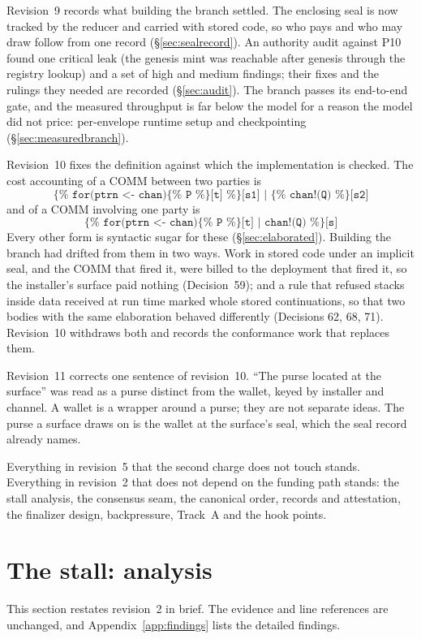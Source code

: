 \documentclass[11pt]{article}
\begin{document}
Revision~9 records what building the branch settled. The enclosing seal is now tracked by the reducer and carried with stored code, so who pays and who may draw follow from one record (\S\ref{sec:sealrecord}). An authority audit against P10 found one critical leak (the genesis mint was reachable after genesis through the registry lookup) and a set of high and medium findings; their fixes and the rulings they needed are recorded (\S\ref{sec:audit}). The branch passes its end-to-end gate, and the measured throughput is far below the model for a reason the model did not price: per-envelope runtime setup and checkpointing (\S\ref{sec:measuredbranch}).

Revision~10 fixes the definition against which the implementation is checked. The cost accounting of a COMM between two parties is
\[
\texttt{\{\%\ for(ptrn <- chan)\{\%\ P\ \%\}[t]\ \%\}[s1]\ |\ \{\%\ chan!(Q)\ \%\}[s2]}
\]
and of a COMM involving one party is
\[
\texttt{\{\%\ for(ptrn <- chan)\{\%\ P\ \%\}[t]\ |\ chan!(Q)\ \%\}[s]}
\]
Every other form is syntactic sugar for these (\S\ref{sec:elaborated}). Building the branch had drifted from them in two ways. Work in stored code under an implicit seal, and the COMM that fired it, were billed to the deployment that fired it, so the installer's surface paid nothing (Decision~59); and a rule that refused stacks inside data received at run time marked whole stored continuations, so that two bodies with the same elaboration behaved differently (Decisions 62, 68, 71). Revision~10 withdraws both and records the conformance work that replaces them.

Revision~11 corrects one sentence of revision~10. ``The purse located at the surface'' was read as a purse distinct from the wallet, keyed by installer and channel. A wallet is a wrapper around a purse; they are not separate ideas. The purse a surface draws on is the wallet at the surface's seal, which the seal record already names.

Everything in revision~5 that the second charge does not touch stands. Everything in revision~2 that does not depend on the funding path stands: the stall analysis, the consensus seam, the canonical order, records and attestation, the finalizer design, backpressure, Track~A and the hook points.
\section{The stall: analysis}\label{sec:analysis}

This section restates revision~2 in brief. The evidence and line references are unchanged, and Appendix~\ref{app:findings} lists the detailed findings.
\end{document}
